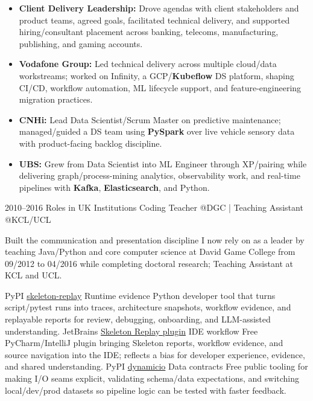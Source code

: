 \documentclass[]{../../../../friggeri-cv}
\begin{document}
\begin{entrylist}
{{        }
        \begin{itemize}[leftmargin=1.1em]
            \item \footnotesize\textbf{Client Delivery Leadership:} Drove agendas with client stakeholders and product teams, agreed goals, facilitated technical delivery, and supported hiring/consultant placement across banking, telecoms, manufacturing, publishing, and gaming accounts.
            \item \footnotesize\textbf{Vodafone Group:} Led technical delivery across multiple cloud/data workstreams; worked on Infinity, a GCP/\textbf{Kubeflow} DS platform, shaping CI/CD, workflow automation, ML lifecycle support, and feature-engineering migration practices.
            \item \footnotesize\textbf{CNHi:} Lead Data Scientist/Scrum Master on predictive maintenance; managed/guided a DS team using \textbf{PySpark} over live vehicle sensory data with product-facing backlog discipline.
            \item \footnotesize\textbf{UBS:} Grew from Data Scientist into ML Engineer through XP/pairing while delivering graph/process-mining analytics, observability work, and real-time pipelines with \textbf{Kafka}, \textbf{Elasticsearch}, and Python.
        \end{itemize}
    }
    \entry
    {2010--2016}
    {Roles in UK Institutions}
    {\small Coding Teacher @DGC | Teaching Assistant @KCL/UCL}
    {
        {\small
        \setlength{\parindent}{0pt}
        \setlength{\leftskip}{0pt}
        Built the communication and presentation discipline I now rely on as a leader by teaching Java/Python and core computer science at David Game College from 09/2012 to 04/2016 while completing doctoral research; Teaching Assistant at KCL and UCL.

        }
    }
\end{entrylist}
\newpage
\setlength{\parskip}{2pt}
\setlength{\parsep}{0pt}
\begin{entrylist2}
    \entrytwo
        {\small PyPI}
        {\small \href{https://pypi.org/project/skeleton-replay/}{skeleton-replay}}
        {\small Runtime evidence}
        {\footnotesize Python developer tool that turns script/pytest runs into traces, architecture snapshots, workflow evidence, and replayable reports for review, debugging, onboarding, and LLM-assisted understanding.}
    \entrytwo
        {\small JetBrains}
        {\small \href{https://plugins.jetbrains.com/plugin/32807-skeleton-replay}{Skeleton Replay plugin}}
        {\small IDE workflow}
        {\footnotesize Free PyCharm/IntelliJ plugin bringing Skeleton reports, workflow evidence, and source navigation into the IDE; reflects a bias for developer experience, evidence, and shared understanding.}
    \entrytwo
        {\small PyPI}
        {\small \href{https://pypi.org/project/dynamicio/}{dynamicio}}
        {\small Data contracts}
        {\footnotesize Free public tooling for making I/O seams explicit, validating schema/data expectations, and switching local/dev/prod datasets so pipeline logic can be tested with faster feedback.}
\end{entrylist2}
\end{document}
